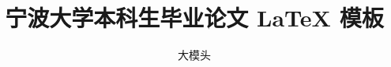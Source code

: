 \documentclass{NBUThesis}
\begin{document}
\title{宁波大学本科生毕业论文 \LaTeX{} 模板}
\author{大模头}
\spine
\end{document}
